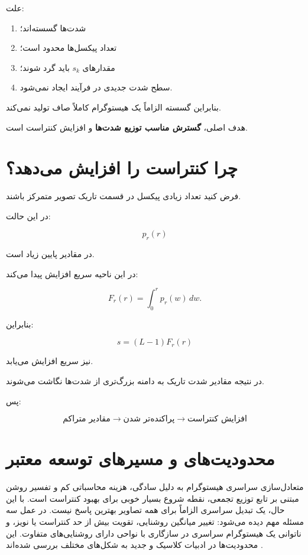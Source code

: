 \documentclass[12pt,a4paper]{article}
\begin{document}
	علت:
	
	\begin{enumerate}
		\item شدت‌ها گسسته‌اند؛
		\item تعداد پیکسل‌ها محدود است؛
		\item مقدارهای $s_k$ باید گرد شوند؛
		\item سطح شدت جدیدی در فرآیند ایجاد نمی‌شود.
	\end{enumerate}
	
	بنابراین  گسسته الزاماً یک هیستوگرام کاملاً
	صاف تولید نمی‌کند.
	
	هدف اصلی، \textbf{گسترش مناسب توزیع شدت‌ها} و افزایش کنتراست است.
	
	
	\section{چرا  کنتراست را افزایش می‌دهد؟}
	
	فرض کنید تعداد زیادی پیکسل در قسمت تاریک تصویر متمرکز باشند.
	
	در این حالت:
	
	\[
	p_r(r)
	\]
	
	در مقادیر پایین زیاد است.
	
	 در این ناحیه سریع افزایش پیدا می‌کند:
	
	\[
	F_r(r)=\int_0^r p_r(w)\,dw.
	\]
	
	بنابراین:
	
	\[
	s=(L-1)F_r(r)
	\]
	
	نیز سریع افزایش می‌یابد.
	
	در نتیجه مقادیر شدت تاریک به دامنه بزرگ‌تری از شدت‌ها نگاشت می‌شوند.
	
	پس:
	
	\[
	\boxed{
		\text{مقادیر متراکم}
		\rightarrow
		\text{پراکنده‌تر شدن}
		\rightarrow
		\text{افزایش کنتراست}
	}
	\]
	
	
	

\section{محدودیت‌های  و مسیرهای توسعه معتبر}

متعادل‌سازی سراسری هیستوگرام به دلیل سادگی، هزینه محاسباتی کم و تفسیر روشن مبتنی بر
تابع توزیع تجمعی، نقطه شروع بسیار خوبی برای بهبود کنتراست است. با این حال، یک تبدیل
سراسری الزاماً برای همه تصاویر بهترین پاسخ نیست. در عمل سه مسئله مهم دیده می‌شود:
تغییر میانگین روشنایی، تقویت بیش از حد کنتراست یا نویز، و ناتوانی یک هیستوگرام سراسری
در سازگاری با نواحی دارای روشنایی‌های متفاوت. این محدودیت‌ها در ادبیات کلاسیک و جدید
به شکل‌های مختلف بررسی شده‌اند \cite{kim1997,pizer1987,stark2000,arici2009}.
\end{document}
